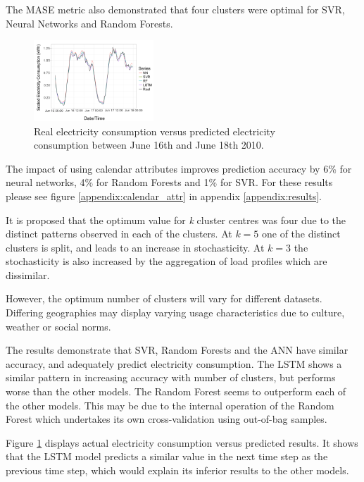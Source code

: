 The MASE metric also demonstrated that four clusters were optimal for SVR, Neural Networks and Random Forests.

\begin{figure}
	\includegraphics[width=0.4\textwidth]{figures/actual_vs_predicted_enlarged.png}
	\caption{Real electricity consumption versus predicted electricity consumption between June 16th and June 18th 2010.}
	\label{fig:act_vs_pred}
\end{figure}

The impact of using calendar attributes improves prediction accuracy by 6\% for neural networks, 4\% for Random Forests and 1\% for SVR. For these results please see figure \ref{appendix:calendar_attr} in appendix \ref{appendix:results}.

It is proposed that the optimum value for \textit{k} cluster centres was four due to the distinct patterns observed in each of the clusters. At $k=5$ one of the distinct clusters is split, and leads to an increase in stochasticity. At $k=3$ the stochasticity is also increased by the aggregation of load profiles which are dissimilar. %

However, the optimum number of clusters will vary for different datasets. Differing geographies may display varying usage characteristics due to culture, weather or social norms.

The results demonstrate that SVR, Random Forests and the ANN have similar accuracy, and adequately predict electricity consumption. The LSTM shows a similar pattern in increasing accuracy with number of clusters, but performs worse than the other models. The Random Forest seems to outperform each of the other models. This may be due to the internal operation of the Random Forest which undertakes its own cross-validation using out-of-bag samples. 

Figure \ref{fig:act_vs_pred} displays actual electricity consumption versus predicted results. It shows that the LSTM model predicts a similar value in the next time step as the previous time step, which would explain its inferior results to the other models.  

